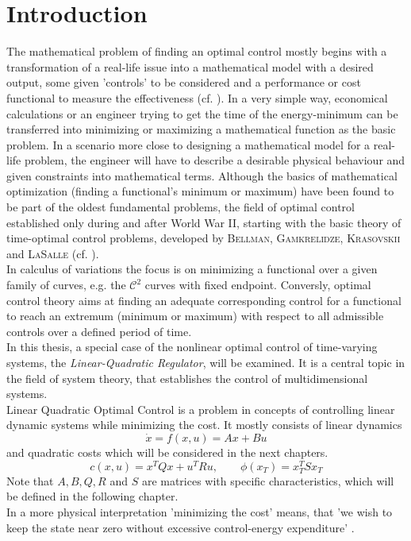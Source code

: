 \documentclass[paper=a4, pagesize, DIV=calc, BCOR=12.5mm, twoside=on, onecolumn=on, open = any, titlepage =on, parskip =half-, headsepline = on, footsepline = on, chapterprefix = on, appendixprefix = off, fontsize = 12pt, numbers = noenddot, abstract = on]{scrbook}
\numberwithin{equation}{chapter}
\theoremstyle{definition}
\theoremstyle{plain}
\theoremstyle{plain}
\theoremstyle{remark}
\theoremstyle{plain}
\theoremstyle{plain}
\begin{document}
\chapter{Introduction}
\onehalfspacing
The mathematical problem of finding an optimal control mostly begins with a transformation of a real-life issue into a mathematical model with a desired output, some given 'controls' to be considered and a performance or cost functional to measure the effectiveness (cf. \cite{athans:1966}). In a very simple way, economical calculations or an engineer trying to get the time of the energy-minimum can be transferred into minimizing or maximizing a mathematical function as the basic problem. 
In a scenario more close to designing a mathematical model for a real-life problem, the engineer will have to describe a desirable physical behaviour and given constraints into mathematical terms. 
Although the basics of mathematical optimization (finding a functional's minimum or maximum) have been found to be part of the oldest fundamental problems, the field of optimal control established only during and after World War II, starting with the basic theory of time-optimal control problems, developed by \textsc{Bellman, Gamkrelidze, Krasovskii} and \textsc{LaSalle} (cf. \cite{athans:1966}).\\
In calculus of variations the focus is on minimizing a functional over a given family of curves, e.g. the $\mathcal{C}^2$ curves with fixed endpoint. Conversly, optimal control theory aims at finding an adequate corresponding control for a functional to reach an extremum (minimum or maximum) with respect to all admissible controls over a defined period of time.\\
In this thesis, a special case of the nonlinear optimal control of time-varying systems, the \emph{Linear-Quadratic Regulator}, will be examined. It is a central topic in the field of system theory, that establishes the control of multidimensional systems.\\
Linear Quadratic Optimal Control is a problem in concepts of controlling linear dynamic systems while minimizing the cost. It mostly consists of linear dynamics 
\[ \dot{x} = f(x, u) = Ax + Bu\]
and quadratic costs which will be considered in the next chapters.
\[  c(x,u) = x^TQx + u^TRu, \qquad \phi(x_T) = x_T^TSx_T\]
Note that $A, B, Q, R$ and $S$ are matrices with specific characteristics, which will be defined in the following chapter.\\
In a more physical interpretation 'minimizing the cost' means, that 'we wish to keep the state near zero without excessive control-energy expenditure' \cite{athans:1966}.
\end{document}
